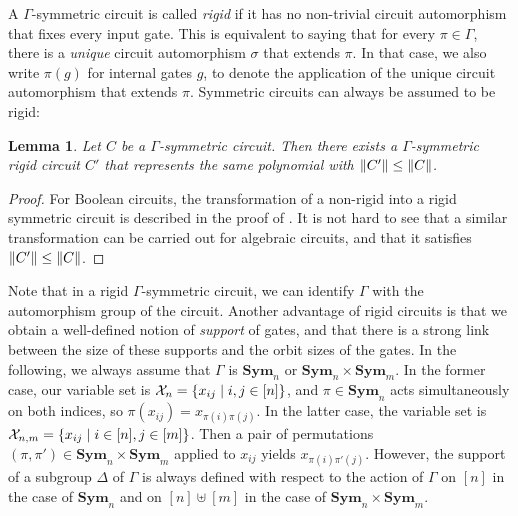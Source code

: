 \documentclass[11pt, DIV=15]{scrarticle}
\theoremstyle{definition}
\theoremstyle{plain}
\newtheorem{lemma}[definition]{Lemma}
\theoremstyle{remark}
\DeclarePairedDelimiter{\norm}{\lVert}{\rVert}
\newcommand{\Xx}{{\cal X}}
\newcommand{\Sym}{\mathbf{Sym}}
\begin{document}
A $\Gamma$-symmetric circuit is called \emph{rigid} if it has no non-trivial circuit automorphism that fixes every input gate. This is equivalent to saying that for every $\pi \in \Gamma$, there is a \emph{unique} circuit automorphism $\sigma$ that extends $\pi$. In that case, we also write $\pi(g)$ for internal gates $g$, to denote the application of the unique circuit automorphism that extends $\pi$. Symmetric circuits can always be assumed to be rigid:

\begin{lemma}
	\label{lem:rigidifyCircuits}
	Let $C$ be a $\Gamma$-symmetric circuit.
	Then there exists a $\Gamma$-symmetric \emph{rigid} circuit
	$C'$ that represents the same polynomial with $\norm{C'} \leq
	\norm{C}$.
\end{lemma}	
\begin{proof}
	For Boolean circuits, the transformation of a non-rigid into a rigid symmetric circuit is described in the proof of \cite[Lemma 7]{anderson_symmetric_2017}. 
	It is not hard to see that a similar transformation can be carried out for algebraic circuits, and that it satisfies $\norm{C'} \leq \norm{C}$.
\end{proof}	
Note that in a rigid $\Gamma$-symmetric circuit, we can identify $\Gamma$ with the automorphism group of the circuit. 
Another advantage of rigid circuits is
that we obtain a well-defined notion of \emph{support} of gates, and
that there is a strong link between the size of these supports and the
orbit sizes of the gates.  
In the following, we always assume that $\Gamma$ is $\Sym_n$ or $\Sym_n \times \Sym_m$.
In the former case, our variable set is $\Xx_n = \{ x_{ij} \mid i,j \in [n] \}$, and $\pi \in \Sym_n$ acts simultaneously on both indices, so $\pi(x_{ij}) = x_{\pi(i)\pi(j)}$.
In the latter case, the variable set is $\Xx_{n,m} = \{x_{ij} \mid i
\in [n], j \in [m]\}$. Then a pair of permutations $(\pi, \pi') \in
\Sym_n \times \Sym_m$ applied to $x_{ij}$ yields $x_{\pi(i)\pi'(j)}$.
However, the support of a subgroup $\Delta$ of $\Gamma$ is always defined
with respect to the action of $\Gamma$ on $[n]$ in the case of
$\Sym_n$ and on $[n]\uplus [m]$ in the case of $\Sym_n \times \Sym_m$.
\end{document}
